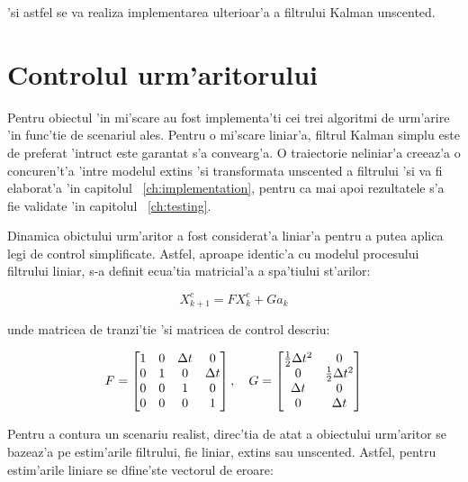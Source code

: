 \documentclass[12pt,a4paper,twoside]{report}
\begin{document}
'si astfel se va realiza implementarea ulterioar'a a filtrului Kalman unscented.

\section{Controlul urm'aritorului}

Pentru obiectul 'in mi'scare au fost implementa'ti cei trei algoritmi de urm'arire 'in func'tie de scenariul ales. Pentru o mi'scare liniar'a, filtrul Kalman simplu este de preferat 'intruc\ia t este garantat s'a convearg'a. O traiectorie neliniar'a creeaz'a o concuren't'a 'intre modelul extins 'si transformata unscented a filtrului 'si va fi elaborat'a 'in capitolul ~\ref{ch:implementation}, pentru ca mai apoi rezultatele s'a fie validate 'in capitolul ~\ref{ch:testing}.

\vspace{5px}

Dinamica obictului urm'aritor a fost considerat'a liniar'a pentru a putea aplica legi de control simplificate. Astfel, aproape identic'a cu modelul procesului filtrului liniar, s-a definit ecua'tia matricial'a a spa'tiului st'arilor:

\begin{equation}
    X^c_{k+1} = F X^c_k + G a_k
\end{equation}

unde matricea de tranzi'tie 'si matricea de control descriu:

\begin{equation}
   F  =  \begin{bmatrix} 1 & 0 & \Delta t & 0 \\ 0 & 1 & 0 & \Delta t\\ 0 & 0 & 1 & 0 \\ 0 & 0 & 0 & 1\end{bmatrix}, \hspace{10px}
   G = \begin{bmatrix} \frac{1}{2} \Delta t^2 & 0  \\0 & \frac{1}{2} \Delta t^2 \\ \Delta t & 0  \\0 &  \Delta t \end{bmatrix}
\end{equation}

Pentru a contura un scenariu realist, direc'tia de atat a obiectului urm'aritor se bazeaz'a pe estim'arile filtrului, fie liniar, extins sau unscented. Astfel, pentru estim'arile liniare se dfine'ste vectorul de eroare: 
\end{document}
